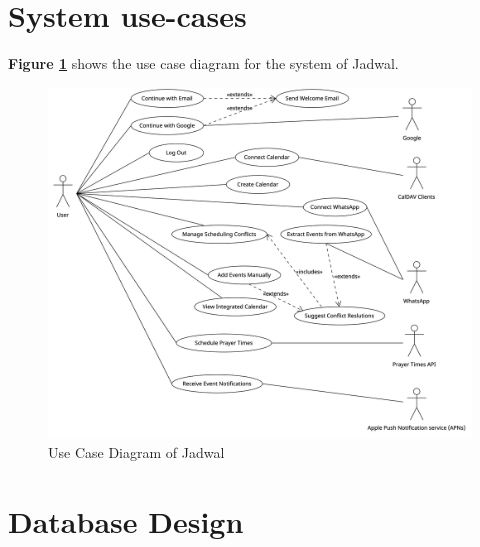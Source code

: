 \documentclass[12pt,a4paper]{report}
\begin{document}
\section{System use-cases}
   
\textbf{Figure \ref{fig:use-case-diagram}} shows the use case diagram for the system of Jadwal.

\begin{figure}[!h]
    \centering
    \includegraphics[width=\textwidth]{images/use-case-diagram.png}
    \caption{Use Case Diagram of Jadwal}
    \label{fig:use-case-diagram}
\end{figure}


















\section{Database Design}
\end{document}
